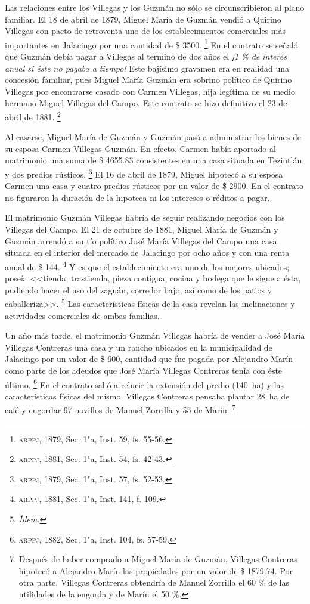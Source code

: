 \documentclass[14pt,twoside,final]{extbook} %
\let\oldfootnote\footnote
\renewcommand\footnote[1]{%
\oldfootnote{\hspace{1mm}#1}}
\begin{document}
Las relaciones entre los Villegas y los Guzmán no sólo se circunscribieron al plano familiar. El 18 de abril de 1879, Miguel María de Guzmán vendió a Quirino Villegas con pacto de retroventa uno de los establecimientos comerciales más importantes en Jalacingo por una cantidad de \$ 3500.\footnote{\textsc{arppj}, 1879, Sec. 1"a, Inst. 59, fs. 55-56.} En el contrato se señaló que Guzmán debía pagar a Villegas al termino de dos años el \emph{¡1 \% de interés anual si éste no pagaba a tiempo!} Este bajísimo gravamen era en realidad una concesión familiar, pues Miguel María Guzmán era sobrino político de Quirino Villegas por encontrarse casado con Carmen Villegas, hija legítima de su medio hermano Miguel Villegas del Campo. Este contrato se hizo definitivo el 23 de abril de 1881.\footnote{\textsc{arppj}, 1881, Sec. 1"a, Inst. 54, fs. 42-43.}

Al casarse, Miguel María de Guzmán y Guzmán pasó a administrar los bienes de su esposa Carmen Villegas Guzmán. En efecto, Carmen había aportado al matrimonio una suma de \$ 4655.83 consistentes en una casa situada en Teziutlán y dos predios rústicos.\footnote{\textsc{arppj}, 1879, Sec. 1"a, Inst. 57, fs. 52-53.} El 16 de abril de 1879, Miguel hipotecó a su esposa Carmen una casa y cuatro predios rústicos por un valor de \$ 2900. En el contrato no figuraron la duración de la hipoteca ni los intereses o réditos a pagar. \enlargethispage{\baselineskip}

El matrimonio Guzmán Villegas habría de seguir realizando negocios con los Villegas del Campo. El 21 de octubre de 1881, Miguel María de Guzmán y Guzmán arrendó a su tío político José María Villegas del Campo una casa situada en el interior del mercado de Jalacingo por ocho años y con una renta anual de \$ 144.\footnote{\textsc{arppj}, 1881, Sec. 1"a, Inst. 141, f. 109.} Y es que el establecimiento era uno de los mejores ubicados; poseía <<tienda, trastienda, pieza contigua, cocina y bodega que le sigue a ésta, pudiendo hacer el uso del zaguán, corredor bajo, así como de los patios y caballeriza>>.\footnote{\em Ídem.} Las características físicas de la casa revelan las inclinaciones y actividades comerciales de ambas familias.

Un año más tarde, el matrimonio Guzmán Villegas habría de vender a José María Villegas Contreras una casa y un rancho ubicados en la municipalidad de Jalacingo por un valor de \$ 600, cantidad que fue pagada por Alejandro Marín como parte de los adeudos que José María Villegas Contreras tenía con éste último.\footnote{\textsc{arppj}, 1882, Sec. 1"a, Inst. 104, fs. 57-59.} En el contrato salió a relucir la extensión del predio (140~ha) y las características físicas del mismo. Villegas Contreras pensaba plantar 28~ha de café y engordar 97 novillos de Manuel Zorrilla y 55 de Marín.\footnote{Después de haber comprado a Miguel María de Guzmán, Villegas Contreras hipotecó a Alejandro Marín las propiedades por un valor de \$ 1879.74. Por otra parte, Villegas Contreras obtendría de Manuel Zorrilla el 60 \% de las utilidades de la engorda y de Marín el 50 \%.}
\end{document}
